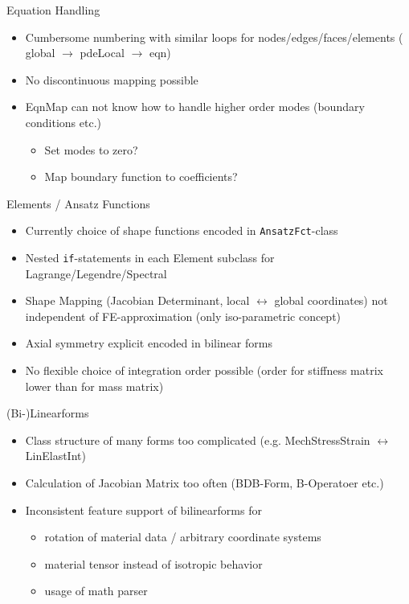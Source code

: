\documentclass[10pt]{beamer}
\begin{document}
\begin{frame}[fragile]{Equation Handling}
\begin{itemize}
 \item Cumbersome numbering with similar loops for nodes/edges/faces/elements
 ( global $\rightarrow$ pdeLocal $\rightarrow$ eqn)
\item No discontinuous mapping possible
\item EqnMap can not know how to handle higher order modes (boundary conditions etc.)
\begin{itemize}
\item Set modes to zero?
\item Map boundary function to coefficients?
\end{itemize}
\end{itemize}
\end{frame}


\begin{frame}[fragile]{Elements / Ansatz Functions}
\begin{itemize}
 \item Currently choice of shape functions encoded in {\tt AnsatzFct}-class
\item Nested \verb+if+-statements in each Element subclass for Lagrange/Legendre/Spectral
\item Shape Mapping (Jacobian Determinant, local $\leftrightarrow$ global coordinates) not independent of FE-approximation (only iso-parametric concept)
\item Axial symmetry explicit encoded in bilinear forms
\item No flexible choice of integration order possible (order for stiffness matrix lower than for mass matrix)
\end{itemize}
\end{frame}


\begin{frame}[fragile]{(Bi-)Linearforms}
 \begin{itemize}
  \item Class structure of many forms too complicated (e.g. MechStressStrain $\leftrightarrow$ LinElastInt)
\item Calculation of Jacobian Matrix too often (BDB-Form, B-Operatoer etc.)
\item Inconsistent feature support of bilinearforms for 
\begin{itemize}
\item rotation of material data / arbitrary coordinate systems
\item material tensor instead of isotropic behavior
\item usage of math parser
\end{itemize}
 \end{itemize}
\end{frame}
\end{document}
